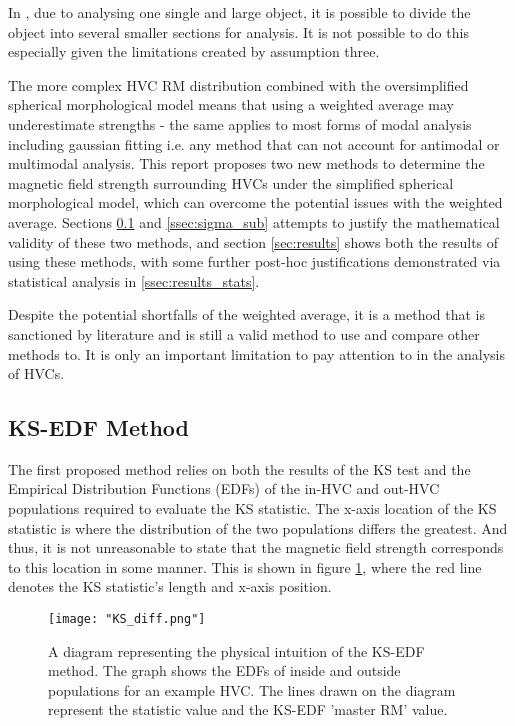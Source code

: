 In \cite{ID5, ID26}, due to analysing one single and large object, it is possible to divide the object into several smaller sections for analysis. It is not possible to do this especially given the limitations created by assumption three.


The more complex HVC RM distribution combined with the oversimplified spherical morphological model means that using a weighted average may underestimate strengths - the same applies to most forms of modal analysis including gaussian fitting i.e. any method that can not account for antimodal or multimodal analysis. This report proposes two new methods to determine the magnetic field strength surrounding HVCs under the simplified spherical morphological model, which can overcome the potential issues with the weighted average. Sections \ref{ssec:KS_EDF} and \ref{ssec:sigma_sub} attempts to justify the mathematical validity of these two methods, and section \ref{sec:results} shows both the results of using these methods, with some further post-hoc justifications demonstrated via statistical analysis in \ref{ssec:results_stats}.


Despite the potential shortfalls of the weighted average, it is a method that is sanctioned by literature and is still a valid method to use and compare other methods to. It is only an important limitation to pay attention to in the analysis of HVCs.


\subsection{KS-EDF Method}
\label{ssec:KS_EDF}

The first proposed method relies on both the results of the KS test and the Empirical Distribution Functions (EDFs) of the in-HVC and out-HVC populations required to evaluate the KS statistic. The x-axis location of the KS statistic is where the distribution of the two populations differs the greatest. And thus, it is not unreasonable to state that the magnetic field strength corresponds to this location in some manner. This is shown in figure \ref{fig:KSdiff}, where the red line denotes the KS statistic's length and x-axis position.


\begin{figure}
    \texttt{[image: "KS\_diff.png"]}
    \centering
    \caption{A diagram representing the physical intuition of the KS-EDF method. The graph shows the EDFs of inside and outside populations for an example HVC. The lines drawn on the diagram represent the statistic value and the KS-EDF 'master RM' value.}
    \label{fig:KSdiff}
\end{figure}

